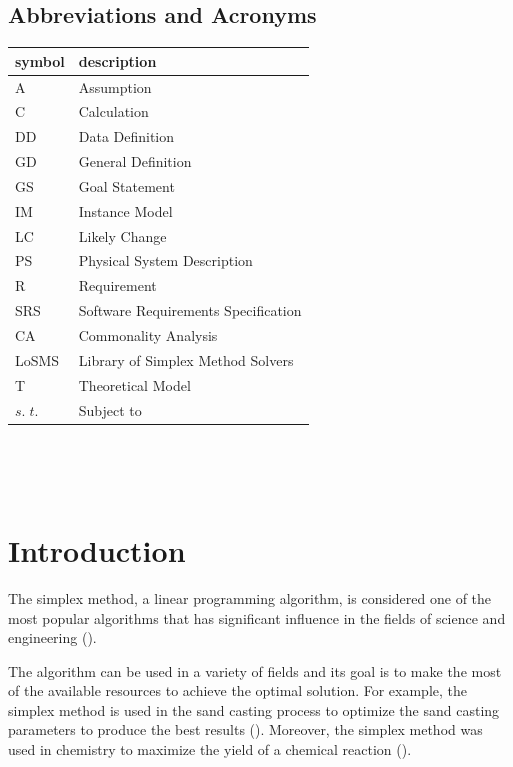\documentclass[12pt]{article}
\newcommand{\famname}{LoSMS} %
\begin{document}
\subsection{Abbreviations and Acronyms}

\renewcommand{\arraystretch}{1.2}
\begin{tabular}{l l} 
  \toprule		
  \textbf{symbol} & \textbf{description}\\
  \midrule 
  A & Assumption\\
  C & Calculation \\
  DD & Data Definition\\
  GD & General Definition\\
  GS & Goal Statement\\
  IM & Instance Model\\
  LC & Likely Change\\
  PS & Physical System Description\\
  R & Requirement\\
  SRS & Software Requirements Specification\\
  CA & Commonality Analysis\\
  \famname{} & Library of Simplex Method Solvers\\
  T & Theoretical Model\\
  $s.\;t.$ & Subject to\\
  \bottomrule
\end{tabular}\\

\newpage

\tableofcontents

~\newpage


\section{Introduction}

The simplex method, a linear programming algorithm, is considered one of the 
most popular algorithms that has significant influence in the fields of science 
and engineering (\cite{simplex-popularity}). 

The algorithm can be used in a variety of fields and its goal is to make the 
most of the available resources to achieve the optimal solution. For example, 
the simplex method is used in the sand casting process to optimize the sand 
casting parameters to produce the best results (\cite{sand-casting}). Moreover, 
the simplex method was used in chemistry to maximize the yield of a chemical 
reaction (\cite{chemistry}).
\end{document}
